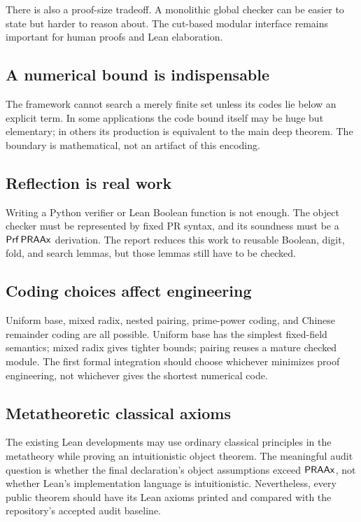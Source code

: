 There is also a proof-size tradeoff.  A monolithic global checker can be easier
to state but harder to reason about.  The cut-based modular interface remains
important for human proofs and Lean elaboration.

\subsection{A numerical bound is indispensable}

The framework cannot search a merely finite set unless its codes lie below an
explicit term.  In some applications the code bound itself may be huge but
elementary; in others its production is equivalent to the main deep theorem.
The boundary is mathematical, not an artifact of this encoding.

\subsection{Reflection is real work}

Writing a Python verifier or Lean Boolean function is not enough.  The object
checker must be represented by fixed PR syntax, and its soundness must be a
\(\mathsf{Prf}\,\mathsf{PRAAx}\) derivation.  The report reduces this work to reusable Boolean,
digit, fold, and search lemmas, but those lemmas still have to be checked.

\subsection{Coding choices affect engineering}

Uniform base, mixed radix, nested pairing, prime-power coding, and Chinese
remainder coding are all possible.  Uniform base has the simplest fixed-field
semantics; mixed radix gives tighter bounds; pairing reuses a mature checked
module.  The first formal integration should choose whichever minimizes proof
engineering, not whichever gives the shortest numerical code.

\subsection{Metatheoretic classical axioms}

The existing Lean developments may use ordinary classical principles in the
metatheory while proving an intuitionistic object theorem.  The meaningful
audit question is whether the final declaration's object assumptions exceed
\(\mathsf{PRAAx}\), not whether Lean's implementation language is intuitionistic.
Nevertheless, every public theorem should have its Lean axioms printed and
compared with the repository's accepted audit baseline.

